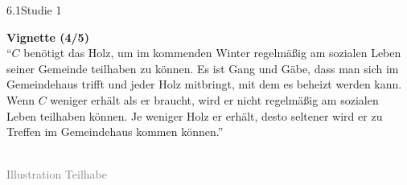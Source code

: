 \documentclass[xcolor=table,9pt,aspectratio=169]{beamer}
\begin{document}
\begin{frame}{\vspace*{10mm}6.1\hspace*{1em}Studie 1}
\begin{multicols}{2}
   \textbf{Vignette (4/5)}\\
   \medskip
   \enquote{$C$ benötigt das Holz, um im kommenden Winter regelmäßig am sozialen Leben seiner Gemeinde teilhaben zu können. Es ist Gang und Gäbe, dass man sich im Gemeindehaus trifft und jeder Holz mitbringt, mit dem es beheizt werden kann. Wenn $C$ weniger erhält als er braucht, wird er nicht regelmäßig am sozialen Leben teilhaben können. Je weniger Holz er erhält, desto seltener wird er zu Treffen im Gemeindehaus kommen können.}
   \vfill
   \begin{center}
      \\
      \footnotesize{\textcolor{gray}{Illustration Teilhabe}}
   \end{center}
\end{multicols}
\end{frame}
\end{document}

